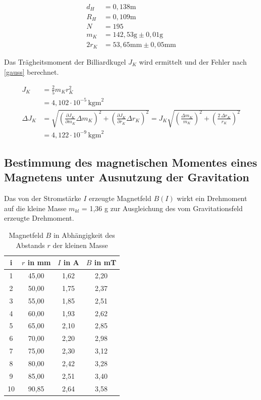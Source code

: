 \begin{align*}
 d_H &= 0,138 \text{m} \\
 R_H &= 0,109 \text{m}\\
 N &= 195\\
 m_K &= 142,53 \text{g} \pm 0,01 \text{g}\\
 2r_K &= 53,65 \text{mm} \pm 0,05 \text{mm}
\end{align*}

Das Trägheitsmoment der Billiardkugel $J_K$ wird ermittelt und der Fehler nach \eqref{gauss} berechnet.

\begin{align}
\nonumber
 J_K &= \frac25 m_K r_K^2 \\
 &= 4,102 \cdot 10^{-5} \, \text{kgm}^2\\
 \nonumber
 \Delta J_K &= \sqrt{\left(\frac{\partial J_K}{\partial m_K} \Delta m_K \right)^2 + \left(\frac{\partial J_K}{\partial r_K} \Delta r_K \right)^2 } = J_K \sqrt{\left( \frac{\Delta m_K}{m_K} \right)^2 + \left( \frac{2 \, \Delta r_K}{r_K} \right)^2}\\
 &= 4,122 \cdot 10^{-9} \, \text{kgm}^2
\end{align}

\subsection[Ermittlung durch Ausnutzen der Gravitation]{Bestimmung des magnetischen Momentes eines Magnetens unter Ausnutzung der Gravitation}
Das von der Stromstärke $I$ erzeugte Magnetfeld $B(I)$ wirkt ein Drehmoment auf die kleine Masse $m_{kl}$ = 1,36 g zur Ausgleichung 
des vom Gravitationsfeld erzeugte Drehmoment.
\begin{table}[H]
 \begin{tabular}{c|c|c|c}
  i & $r$ in mm & $I$ in A & $B$ in mT\\
  \hline
1&	45,00&	1,62&	2,20\\
2&	50,00&	1,75&	2,37\\
3&	55,00&	1,85&	2,51\\
4&	60,00&	1,93&	2,62\\
5&	65,00&	2,10&	2,85\\
6&	70,00&	2,20&	2,98\\
7&	75,00&	2,30&	3,12\\
8&	80,00&	2,42&	3,28\\
9&	85,00&	2,51&	3,40\\
10&	90,85&	2,64&	3,58

 \end{tabular}
\caption{Magnetfeld $B$ in Abhängigkeit des Abstands $r$ der kleinen Masse}
\label{tabgrav}
\end{table}

